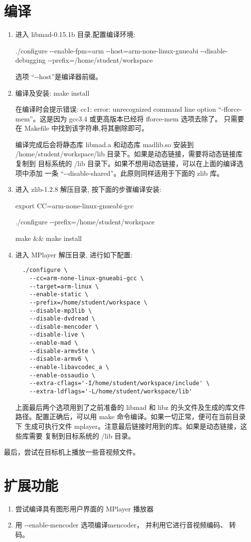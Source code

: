 \section{编译}
\begin{enumerate}
  \item 进入 libmad-0.15.1b 目录,配置编译环境:

	./configure -{}-enable-fpm=arm -{}-host=arm-none-linux-gnueabi
	-{}-disable-debugging -{}-prefix=/home/student/workspace

	选项 ``-{}-host''是编译器前缀。

  \item 编译及安装:  make install

	在编译时会提示错误: cc1: error: unrecognized command line option
	``-fforce-mem''。这是因为 gcc3.4 或更高版本已经将 fforce-mem 选项去除了。
	只需要在 Makefile 中找到该字符串,将其删除即可。

	编译完成后会将静态库 libmad.a 和动态库 madlib.so 安装到
	/home/student/workspace/lib 目录下。如果是动态链接，需要将动态链接库复制到
	目标系统的 /lib 目录下。如果不想用动态链接，可以在上面的编译选项中添加
	一条 ``-{}-disable-shared''。此原则同样适用于下面的 zlib 库。

  \item 进入 zlib-1.2.8 解压目录, 按下面的步骤编译安装:

	export CC=arm-none-linux-gnueabi-gcc

	./configure -{}-prefix=/home/student/workspace

        make \&\& make install

  \item 进入 MPlayer 解压目录, 进行如下配置:
\begin{verbatim}
  ./configure \
    --cc=arm-none-linux-gnueabi-gcc \
    --target=arm-linux \
    --enable-static \
    --prefix=/home/student/workspace \
    --disable-mp3lib \
    --disable-dvdread \
    --disable-mencoder \
    --disable-live \
    --enable-mad \
    --disable-armv5te \
    --disable-armv6 \
    --enable-libavcodec_a \
    --enable-ossaudio \
    --extra-cflags='-I/home/student/workspace/include' \
    --extra-ldflags='-L/home/student/workspace/lib'
    \end{verbatim}
	上面最后两个选项用到了之前准备的 libmad 和 libz 的头文件及生成的库文件
	路径。配置正确后，可以用 make 命令编译。如果一切正常，便可在当前目录下
	生成可执行文件 mplayer。注意最后链接时用到的库。如果是动态链接，这些库需要
	复制到目标系统的 /lib 目录。
\end{enumerate}

	最后，尝试在目标机上播放一些音视频文件。

\section{扩展功能}
\begin{enumerate}
  \item 尝试编译具有图形用户界面的 MPlayer 播放器
  \item 用 -{}-enable-mencoder 选项编译mencoder， 并利用它进行音视频编码、
	转码。
\end{enumerate}
